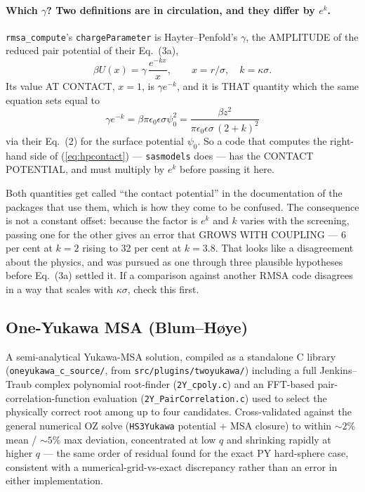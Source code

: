 \documentclass[11pt,a4paper]{article}
\newcommand{\code}[1]{\texttt{#1}}
\begin{document}
\paragraph{Which $\gamma$? Two definitions are in circulation, and they
differ by $e^{k}$.} \code{rmsa\_compute}'s \code{chargeParameter} is
Hayter--Penfold's $\gamma$, the AMPLITUDE of the reduced pair potential of
their Eq.~(3a),
\begin{equation}
\beta U(x) = \gamma\,\frac{e^{-kx}}{x},
\qquad x = r/\sigma,\quad k = \kappa\sigma .
\label{eq:hpgammarep}
\end{equation}
Its value AT CONTACT, $x=1$, is $\gamma e^{-k}$, and it is THAT quantity
which the same equation sets equal to
\begin{equation}
\gamma e^{-k} = \beta\pi\epsilon_0\epsilon\sigma\psi_0^2
= \frac{\beta z^2}{\pi\epsilon_0\epsilon\sigma\,(2+k)^2}
\label{eq:hpcontact}
\end{equation}
via their Eq.~(2) for the surface potential $\psi_0$. So a code that
computes the right-hand side of (\ref{eq:hpcontact}) --- \code{sasmodels}
does --- has the CONTACT POTENTIAL, and must multiply by $e^{k}$ before
passing it here.

Both quantities get called ``the contact potential'' in the documentation of
the packages that use them, which is how they come to be confused. The
consequence is not a constant offset: because the factor is $e^{k}$ and $k$
varies with the screening, passing one for the other gives an error that
GROWS WITH COUPLING --- 6 per cent at $k=2$ rising to 32 per cent at
$k=3.8$. That looks like a disagreement about the physics, and was pursued
as one through three plausible hypotheses before Eq.~(3a) settled it. If a
comparison against another RMSA code disagrees in a way that scales with
$\kappa\sigma$, check this first.

\subsection{One-Yukawa MSA (Blum--H\o ye)}
A semi-analytical Yukawa-MSA solution, compiled as a standalone C library
(\code{oneyukawa\_c\_source/}, from \code{src/plugins/twoyukawa/}) including a
full Jenkins--Traub complex polynomial root-finder (\code{2Y\_cpoly.c}) and an
FFT-based pair-correlation-function evaluation (\code{2Y\_PairCorrelation.c})
used to select the physically correct root among up to four candidates.
Cross-validated against the general numerical OZ solve (\code{HS3Yukawa}
potential + MSA closure) to within $\sim2\%$ mean / $\sim5\%$ max deviation,
concentrated at low $q$ and shrinking rapidly at higher $q$ --- the same order
of residual found for the exact PY hard-sphere case, consistent with a
numerical-grid-vs-exact discrepancy rather than an error in either
implementation.
\end{document}
